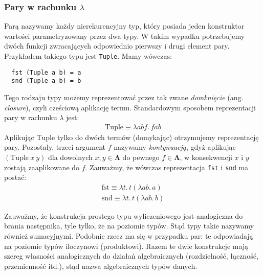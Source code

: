 \subsubsection{Pary w rachunku \(\lambda\)}
Parą nazywamy każdy nierekurencyjny typ, który posiada jeden konstruktor wartości parametryzowany przez dwa typy. W takim wypadku potrzebujemy dwóch funkcji zwracających odpowiednio pierwszy i drugi element pary. Przykładem takiego typu jest \texttt{Tuple}. Mamy wówczas:
\begin{verbatim}
  fst (Tuple a b) = a
  snd (Tuple a b) = b
\end{verbatim}
Tego rodzaju typy możemy reprezentować przez tak zwane \emph{domknięcie} (ang. \emph{closure}), czyli cześciową aplikację termu. Standardowym sposobem reprezentacji pary w rachunku \(\lambda\) jest:
\begin{align*}
  \mathrm{Tuple}\equiv\lambda a b f .\,f a b
\end{align*}
Aplikując \(\mathrm{Tuple}\) tylko do dwóch termów (domykając) otrzymujemy reprezentację pary. Pozostały, trzeci argument \(f\) nazywamy \emph{kontynuacją}, gdyż aplikując \((\mathrm{Tuple}\ x\ y)\) dla dowolnych \(x, y\in\mathbf{\Lambda}\) do pewnego \(f\in\mathbf{\Lambda}\), w konsekwencji \(x\) i \(y\) zostają zaaplikowane do \(f\).
Zauważmy, że wówczas reprezentacja \texttt{fst} i \texttt{snd} ma postać:
\begin{align*}
  \mathrm{fst} \equiv \lambda t.\,t(\lambda a b.\,a) \\
  \mathrm{snd} \equiv \lambda t.\,t(\lambda a b.\,b)
\end{align*}

\begin{uwaga*}
  Zauważmy, że konstrukcja prostego typu wyliczeniowego jest analogiczna do brania następnika, tyle tylko, że na poziomie typów. Stąd typy takie nazywamy również sumacyjnymi. Podobnie rzecz ma się w przypadku par: te odpowiadają na poziomie typów iloczynowi (produktowi). Razem te dwie konstrukcje mają szereg własności analogicznych do
  działań algebraicznych (rozdzielność, łączność, przemienność itd.), stąd nazwa algebraicznych typów danych.
\end{uwaga*}

